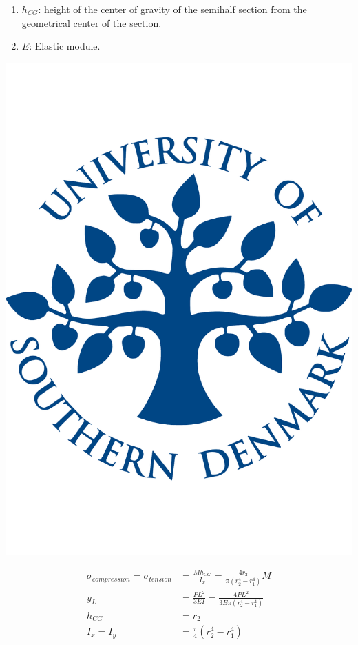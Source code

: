   \begin{enumerate}
    \item $h_{CG}$: height of the center of gravity of the semihalf section from the geometrical center of the section.

    \item $E$: Elastic module.
  \end{enumerate}


  \noindent\begin{minipage}{0.2\textwidth}%
      \includegraphics[width=\linewidth]{figures/sdu_logo.pdf}
  \end{minipage}%
  \hfill%
  \begin{minipage}{0.8\textwidth}
    \begin{equation}
      \begin{align*}
      \sigma _{compression} = \sigma _{tension} &= \frac{M h_{CG}}{I_x} = \frac{4 r_2}{\pi(r_2 ^4 - r_1 ^4)} M \\
      y_L &= \frac{P L^2}{3EI} = \frac{4 P L^2}{3 E \pi(r_2 ^4 - r_1 ^4)}\\
      h_{CG} &= r_2 \\
      I_x = I_y &= \frac{\pi}{4} (r_2 ^4 - r_1 ^4)
      \end{align*}
    \end{equation}
  \end{minipage}

